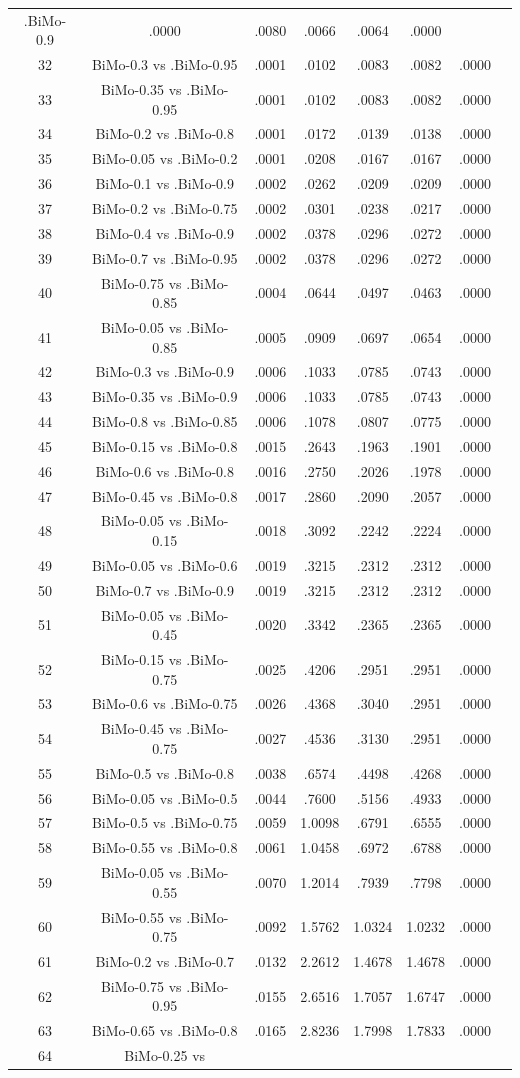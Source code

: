 \documentclass[a4paper,10pt]{article}
\begin{document}
\begin{landscape}
\begin{table}[!htp]
\begin{tabular}{cccccccc}
.BiMo-0.9&.0000&.0080&.0066&.0064&.0000\\32&BiMo-0.3 vs .BiMo-0.95&.0001&.0102&.0083&.0082&.0000\\33&BiMo-0.35 vs .BiMo-0.95&.0001&.0102&.0083&.0082&.0000\\34&BiMo-0.2 vs .BiMo-0.8&.0001&.0172&.0139&.0138&.0000\\35&BiMo-0.05 vs .BiMo-0.2&.0001&.0208&.0167&.0167&.0000\\36&BiMo-0.1 vs .BiMo-0.9&.0002&.0262&.0209&.0209&.0000\\37&BiMo-0.2 vs .BiMo-0.75&.0002&.0301&.0238&.0217&.0000\\38&BiMo-0.4 vs .BiMo-0.9&.0002&.0378&.0296&.0272&.0000\\39&BiMo-0.7 vs .BiMo-0.95&.0002&.0378&.0296&.0272&.0000\\40&BiMo-0.75 vs .BiMo-0.85&.0004&.0644&.0497&.0463&.0000\\41&BiMo-0.05 vs .BiMo-0.85&.0005&.0909&.0697&.0654&.0000\\42&BiMo-0.3 vs .BiMo-0.9&.0006&.1033&.0785&.0743&.0000\\43&BiMo-0.35 vs .BiMo-0.9&.0006&.1033&.0785&.0743&.0000\\44&BiMo-0.8 vs .BiMo-0.85&.0006&.1078&.0807&.0775&.0000\\45&BiMo-0.15 vs .BiMo-0.8&.0015&.2643&.1963&.1901&.0000\\46&BiMo-0.6 vs .BiMo-0.8&.0016&.2750&.2026&.1978&.0000\\47&BiMo-0.45 vs .BiMo-0.8&.0017&.2860&.2090&.2057&.0000\\48&BiMo-0.05 vs .BiMo-0.15&.0018&.3092&.2242&.2224&.0000\\49&BiMo-0.05 vs .BiMo-0.6&.0019&.3215&.2312&.2312&.0000\\50&BiMo-0.7 vs .BiMo-0.9&.0019&.3215&.2312&.2312&.0000\\51&BiMo-0.05 vs .BiMo-0.45&.0020&.3342&.2365&.2365&.0000\\52&BiMo-0.15 vs .BiMo-0.75&.0025&.4206&.2951&.2951&.0000\\53&BiMo-0.6 vs .BiMo-0.75&.0026&.4368&.3040&.2951&.0000\\54&BiMo-0.45 vs .BiMo-0.75&.0027&.4536&.3130&.2951&.0000\\55&BiMo-0.5 vs .BiMo-0.8&.0038&.6574&.4498&.4268&.0000\\56&BiMo-0.05 vs .BiMo-0.5&.0044&.7600&.5156&.4933&.0000\\57&BiMo-0.5 vs .BiMo-0.75&.0059&1.0098&.6791&.6555&.0000\\58&BiMo-0.55 vs .BiMo-0.8&.0061&1.0458&.6972&.6788&.0000\\59&BiMo-0.05 vs .BiMo-0.55&.0070&1.2014&.7939&.7798&.0000\\60&BiMo-0.55 vs .BiMo-0.75&.0092&1.5762&1.0324&1.0232&.0000\\61&BiMo-0.2 vs .BiMo-0.7&.0132&2.2612&1.4678&1.4678&.0000\\62&BiMo-0.75 vs .BiMo-0.95&.0155&2.6516&1.7057&1.6747&.0000\\63&BiMo-0.65 vs .BiMo-0.8&.0165&2.8236&1.7998&1.7833&.0000\\64&BiMo-0.25 vs 
\end{tabular}
\end{table}
\end{landscape}
\end{document}
